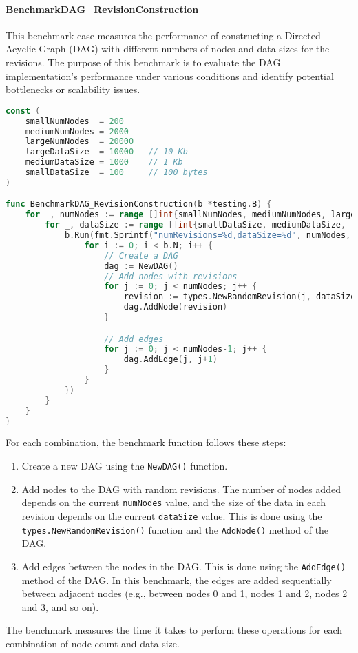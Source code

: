\paragraph{BenchmarkDAG\_RevisionConstruction}
This benchmark case measures the performance of constructing a Directed Acyclic Graph (DAG) with different numbers of nodes and data sizes for the revisions. The purpose of this benchmark is to evaluate the DAG implementation's performance under various conditions and identify potential bottlenecks or scalability issues.

\begin{lstlisting}[language=go]
const (
	smallNumNodes  = 200
	mediumNumNodes = 2000
	largeNumNodes  = 20000
	largeDataSize  = 10000   // 10 Kb
	mediumDataSize = 1000    // 1 Kb
	smallDataSize  = 100     // 100 bytes
)

func BenchmarkDAG_RevisionConstruction(b *testing.B) {
	for _, numNodes := range []int{smallNumNodes, mediumNumNodes, largeNumNodes} {
		for _, dataSize := range []int{smallDataSize, mediumDataSize, largeDataSize} {
			b.Run(fmt.Sprintf("numRevisions=%d,dataSize=%d", numNodes, dataSize), func(b *testing.B) {
				for i := 0; i < b.N; i++ {
					// Create a DAG
					dag := NewDAG()
					// Add nodes with revisions
					for j := 0; j < numNodes; j++ {
						revision := types.NewRandomRevision(j, dataSize)
						dag.AddNode(revision)
					}

					// Add edges
					for j := 0; j < numNodes-1; j++ {
						dag.AddEdge(j, j+1)
					}
				}
			})
		}
	}
}
\end{lstlisting}
\medskip

For each combination, the benchmark function follows these steps:
\begin{enumerate}
    \item Create a new DAG using the \lstinline{NewDAG()} function.
    \item Add nodes to the DAG with random revisions. The number of nodes added depends on the current \lstinline{numNodes} value, and the size of the data in each revision depends on the current \lstinline{dataSize} value. This is done using the \lstinline{types.NewRandomRevision()} function and the \lstinline{AddNode()} method of the DAG.
    \item Add edges between the nodes in the DAG. This is done using the \lstinline{AddEdge()} method of the DAG. In this benchmark, the edges are added sequentially between adjacent nodes (e.g., between nodes 0 and 1, nodes 1 and 2, nodes 2 and 3, and so on).
\end{enumerate}
The benchmark measures the time it takes to perform these operations for each combination of node count and data size.

